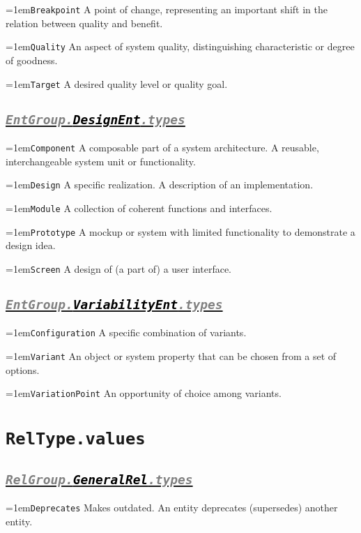 \documentclass[a4paper,oneside]{article}
\newcommand\Concept[2]{\hangindent=1em\lstinline+#1+ #2}
\begin{document}
\begin{multicols*}{4}
\Concept{Breakpoint}{A point of change, representing an important shift in the relation between quality and benefit.}

\Concept{Quality}{An aspect of system quality, distinguishing characteristic or degree of goodness.}

\Concept{Target}{A desired quality level or quality goal.}


\subsection*{\underline{\texttt{\textit{{\textcolor{gray}{EntGroup.}\textcolor{black}{DesignEnt}}\textcolor{gray}{.types}}}}}
\Concept{Component}{A composable part of a system architecture. A reusable, interchangeable system unit or functionality.}

\Concept{Design}{A specific realization. A description of an implementation.}

\Concept{Module}{A collection of coherent functions and interfaces.}

\Concept{Prototype}{A mockup or system with limited functionality to demonstrate a design idea.}

\Concept{Screen}{A design of (a part of) a user interface.}


\subsection*{\underline{\texttt{\textit{{\textcolor{gray}{EntGroup.}\textcolor{black}{VariabilityEnt}}\textcolor{gray}{.types}}}}}
\Concept{Configuration}{A specific combination of variants.}

\Concept{Variant}{An object or system property that can be chosen from a set of options.}

\Concept{VariationPoint}{An opportunity of choice among variants.}




\section*{\texttt{RelType.values}}

\subsection*{\underline{\texttt{\textit{{\textcolor{gray}{RelGroup.}\textcolor{black}{GeneralRel}}\textcolor{gray}{.types}}}}}
\Concept{Deprecates}{Makes outdated. An entity deprecates (supersedes) another entity.}


\end{multicols*}
\end{document}
